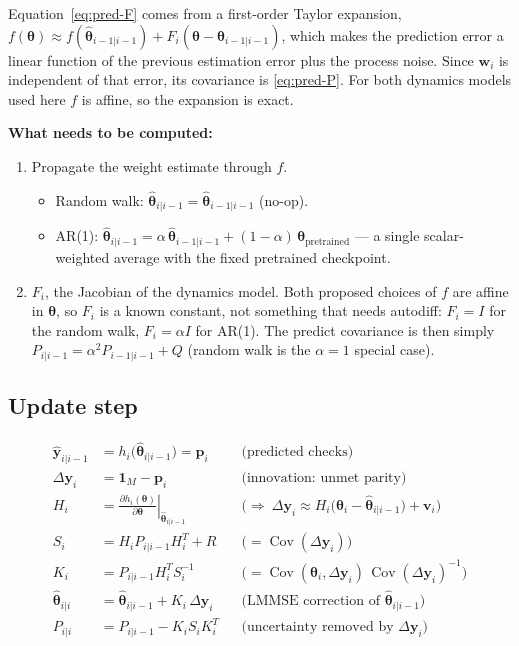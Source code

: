 \documentclass{article}
\newcommand{\state}{\boldsymbol{\theta}}
\begin{document}
Equation~\eqref{eq:pred-F} comes from a first-order Taylor expansion,
$f(\state)\approx f(\hat{\state}_{i-1|i-1}) + F_i(\state-\hat{\state}_{i-1|i-1})$, which makes
the prediction error a linear function of the previous estimation error plus the process
noise. Since $\mathbf{w}_i$ is independent of that error, its covariance is \eqref{eq:pred-P}. For both
dynamics models used here $f$ is affine, so the expansion is exact.

\textbf{What needs to be computed:}
\begin{enumerate}[itemsep=2pt]
  \item Propagate the weight estimate through $f$.
  \begin{itemize}[itemsep=2pt]
    \item Random walk: $\hat{\state}_{i|i-1} = \hat{\state}_{i-1|i-1}$ (no-op).
    \item AR(1): $\hat{\state}_{i|i-1} = \alpha\,\hat{\state}_{i-1|i-1} +
    (1-\alpha)\,\state_{\text{pretrained}}$ — a single scalar-weighted average with the fixed
    pretrained checkpoint.
  \end{itemize}
  \item $F_i$, the Jacobian of the dynamics model. Both proposed choices of $f$ are affine in
  $\state$, so $F_i$ is a known constant, not something that needs autodiff:
  $F_i = I$ for the random walk, $F_i = \alpha I$ for AR(1). The predict covariance is then
  simply $P_{i|i-1} = \alpha^2 P_{i-1|i-1} + Q$ (random walk is the $\alpha=1$ special case).
\end{enumerate}

\subsection{Update step}
\label{sec:update}

\begin{align}
\hat{\mathbf{y}}_{i|i-1} &= h_i\big(\hat{\state}_{i|i-1}\big) = \mathbf{p}_i \label{eq:yhat}
  && \text{(predicted checks)} \\
\Delta \mathbf{y}_i &= \mathbf{1}_M - \mathbf{p}_i \label{eq:innov}
  && \text{(innovation: unmet parity)} \\
H_i &= \left.\frac{\partial h_i(\state)}{\partial \state}\right|_{\hat{\state}_{i|i-1}} \label{eq:H}
  && \Big(\Rightarrow\ \Delta\mathbf{y}_i \approx H_i\big(\state_i-\hat{\state}_{i|i-1}\big)+\mathbf{v}_i\Big) \\
S_i &= H_i P_{i|i-1} H_i^T + R \label{eq:S}
  && \big(= \operatorname{Cov}(\Delta\mathbf{y}_i)\big) \\
K_i &= P_{i|i-1} H_i^T S_i^{-1} \label{eq:K}
  && \big(= \operatorname{Cov}(\state_i,\Delta\mathbf{y}_i)\,\operatorname{Cov}(\Delta\mathbf{y}_i)^{-1}\big) \\
\hat{\state}_{i|i} &= \hat{\state}_{i|i-1} + K_i \, \Delta \mathbf{y}_i \label{eq:upd}
  && \text{(LMMSE correction of } \hat{\state}_{i|i-1}\text{)} \\
P_{i|i} &= P_{i|i-1} - K_i S_i K_i^T \label{eq:Pupd}
  && \text{(uncertainty removed by } \Delta\mathbf{y}_i\text{)}
\end{align}
\end{document}
